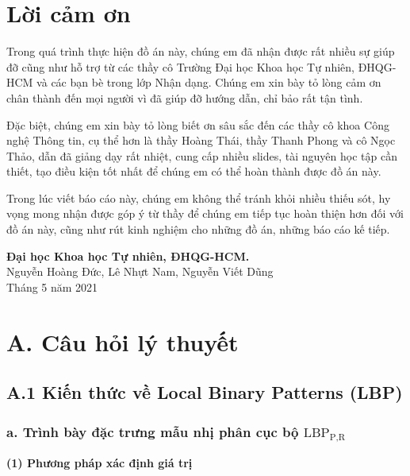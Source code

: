 \documentclass{article}
\begin{document}
	\cleardoublepage
	\section*{Lời cảm ơn}
	\vspace{1.0in}
	\begingroup
	\setlength{\parindent}{0pt}
	\qquad Trong quá trình thực hiện đồ án này, chúng em đã nhận được rất nhiều sự giúp đỡ cũng như hỗ trợ từ các thầy cô Trường Đại học Khoa học Tự nhiên, ĐHQG-HCM và các bạn bè trong lớp Nhận dạng. Chúng em xin bày tỏ lòng cảm ơn chân thành đến mọi người vì đã giúp đỡ hướng dẫn, chỉ bảo rất tận tình.
	
	Đặc biệt, chúng em xin bày tỏ lòng biết ơn sâu sắc đến các thầy cô khoa Công nghệ Thông tin, cụ thể hơn là thầy Hoàng Thái, thầy Thanh Phong và cô Ngọc Thảo, dẫn đã giảng dạy rất nhiệt, cung cấp nhiều slides, tài nguyên học tập cần thiết, tạo điều kiện tốt nhất để chúng em có thể hoàn thành được đồ án này.
	
	Trong lúc viết báo cáo này, chúng em không thể tránh khỏi nhiều thiếu sót, hy vọng mong nhận được góp ý từ thầy để chúng em tiếp tục hoàn thiện hơn đối với đồ án này, cũng như rút kinh nghiệm cho những đồ án, những báo cáo kế tiếp.
	
	\vspace{1.0in}
	\textbf{Đại học Khoa học Tự nhiên, ĐHQG-HCM.}\\
	Nguyễn Hoàng Đức, Lê Nhựt Nam, Nguyễn Viết Dũng\\
	Tháng 5 năm 2021\\
	\endgroup
	\newpage
	\tableofcontents
	\newpage
	\setcounter{secnumdepth}{0}
	
	\section{A. Câu hỏi lý thuyết}
	
	\subsection{A.1 Kiến thức về Local Binary Patterns (LBP)}
	
	\subsubsection{a. Trình bày đặc trưng mẫu nhị phân cục bộ $\text{LBP}_{\text{P,R}}$}
	\textbf{(1) Phương pháp xác định giá trị}\newline
	
\end{document}
